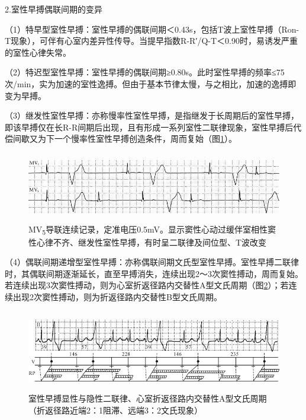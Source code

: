 2.室性早搏偶联间期的变异

（1）特早型室性早搏：室性早搏的偶联间期＜0.43s，包括T波上室性早搏（Ron-T现象），可伴有心室内差异性传导。当提早指数R-R′/Q-T＜0.90时，易诱发严重的室性心律失常。

（2）特迟型室性早搏：室性早搏的偶联间期≥0.80s。此时室性早搏的频率≤75次/min，实为加速的室性逸搏。但由于基本节律太慢，与之相比，加速的逸搏即变为早搏。

（3）继发性室性早搏：亦称慢率性室性早搏，是指继发于长周期后的室性早搏，即该早搏仅在长R-R间期后出现，且有形成一系列室性二联律现象，室性早搏后代偿间歇又为下一个慢率性室性早搏创造条件，周而复始（图\ref{fig11-24}）。

\begin{figure}[!htbp]
 \centering
 \includegraphics[width=5.58333in,height=1.1875in]{./images/Image00184.jpg}
 \captionsetup{justification=centering}
 \caption{MV\textsubscript{5}导联连续记录，定准电压0.5mV。显示窦性心动过缓伴室相性窦性心律不齐、继发性室性早搏，有时呈二联律及间位型、T波改变}
 \label{fig11-24}
  \end{figure} 


（4）偶联间期递增型室性早搏：亦称偶联间期文氏型室性早搏。室性早搏二联律时，其偶联间期逐渐延长，直至早搏消失，连续出现2～3次窦性搏动，周而复始。若连续出现3次窦性搏动，则为心室折返径路内交替性A型文氏周期（图\ref{fig11-25}）；若连续出现2次窦性搏动，则为折返径路内交替性B型文氏周期。

\begin{figure}[!htbp]
 \centering
 \includegraphics[width=5.67708in,height=1.38542in]{./images/Image00185.jpg}
 \captionsetup{justification=centering}
 \caption{室性早搏显性与隐性二联律、心室折返径路内交替性A型文氏周期（折返径路近端2：1阻滞、远端3：2文氏现象）}
 \label{fig11-25}
  \end{figure} 

